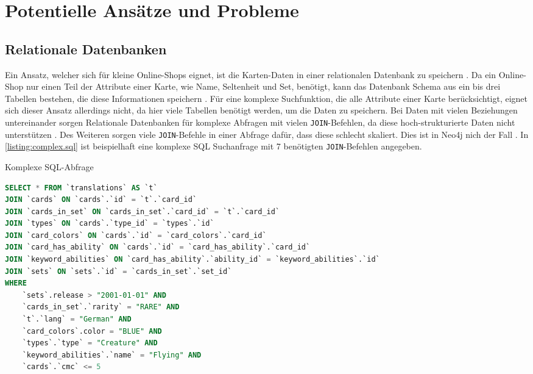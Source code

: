 \section{Potentielle Ansätze und Probleme}\label{ch:ansaetze-probleme}

\subsection{Relationale Datenbanken}
Ein Ansatz, welcher sich für kleine Online-Shops eignet, ist die Karten-Daten in einer relationalen Datenbank zu speichern \cite{johnson2013online}. Da ein Online-Shop nur einen Teil der Attribute einer Karte, wie Name, Seltenheit und Set, benötigt, kann das Datenbank Schema aus ein bis drei Tabellen bestehen, die diese Informationen speichern \cite{johnson2013online}. Für eine komplexe Suchfunktion, die alle Attribute einer Karte berücksichtigt, eignet sich dieser Ansatz allerdings nicht, da hier viele Tabellen benötigt werden, um die Daten zu speichern. Bei Daten mit vielen Beziehungen untereinander sorgen Relationale Datenbanken für komplexe Abfragen mit vielen \verb|JOIN|-Befehlen, da diese hoch-strukturierte Daten nicht unterstützen \cite{robinsongraph:2015}. Des Weiteren sorgen viele \verb|JOIN|-Befehle in einer Abfrage dafür, dass diese schlecht skaliert. Dies ist in Neo4j nich der Fall \cite{robinsongraph:2015}. In \autoref{listing:complex.sql} ist beispielhaft eine komplexe SQL Suchanfrage mit 7 benötigten \verb|JOIN|-Befehlen angegeben.

\begin{listing}[t]
    \caption{Komplexe SQL-Abfrage}
    \label{listing:complex.sql}
    \begin{lstlisting}[language=SQL]
SELECT * FROM `translations` AS `t` 
JOIN `cards` ON `cards`.`id` = `t`.`card_id`
JOIN `cards_in_set` ON `cards_in_set`.`card_id` = `t`.`card_id`
JOIN `types` ON `cards`.`type_id` = `types`.`id`
JOIN `card_colors` ON `cards`.`id` = `card_colors`.`card_id`
JOIN `card_has_ability` ON `cards`.`id` = `card_has_ability`.`card_id`
JOIN `keyword_abilities` ON `card_has_ability`.`ability_id` = `keyword_abilities`.`id`
JOIN `sets` ON `sets`.`id` = `cards_in_set`.`set_id`
WHERE
    `sets`.release > "2001-01-01" AND
    `cards_in_set`.`rarity` = "RARE" AND
    `t`.`lang` = "German" AND
    `card_colors`.color = "BLUE" AND
    `types`.`type` = "Creature" AND
    `keyword_abilities`.`name` = "Flying" AND
    `cards`.`cmc` <= 5
    \end{lstlisting}
\end{listing}


